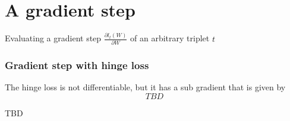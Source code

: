 \documentclass{article}
\begin{document}
\section{A gradient step} 
Evaluating a gradient step  $\frac{\partial {l_t (W)}}{\partial W}$ of an arbitrary triplet $t$
\subsubsection{Gradient step with hinge loss} 
The hinge loss is not differentiable, but it has a sub gradient that is given by
\begin{equation}
TBD
\end{equation}

TBD




\end{document}
